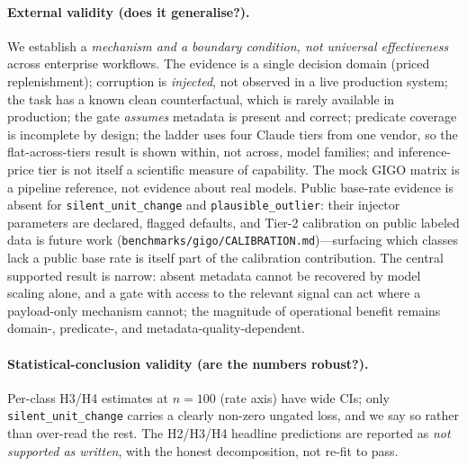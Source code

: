 \documentclass[11pt]{article}
\theoremstyle{plain}
\theoremstyle{definition}
\begin{document}
\paragraph{External validity (does it generalise?).} We establish a \emph{mechanism and a
boundary condition, not universal effectiveness} across enterprise workflows. The evidence
is a single decision domain (priced replenishment); corruption is \emph{injected}, not
observed in a live production system; the task has a known clean counterfactual, which is
rarely available in production; the gate \emph{assumes} metadata is present and correct;
predicate coverage is incomplete by design; the ladder uses four Claude tiers from one
vendor, so the flat-across-tiers result is shown within, not across, model families; and
inference-price tier is not itself a scientific measure of capability. The mock GIGO matrix
is a pipeline reference, not evidence about real models. Public base-rate evidence is absent
for \texttt{silent\_unit\_change} and \texttt{plausible\_outlier}: their injector parameters
are declared, flagged defaults, and Tier-2 calibration on public labeled data is future work
(\texttt{benchmarks/gigo/CALIBRATION.md})---surfacing which classes lack a public base rate
is itself part of the calibration contribution. The central supported result is narrow:
absent metadata cannot be recovered by model scaling alone, and a gate with access to the
relevant signal can act where a payload-only mechanism cannot; the magnitude of operational
benefit remains domain-, predicate-, and metadata-quality-dependent.
\paragraph{Statistical-conclusion validity (are the numbers robust?).} Per-class H3/H4
estimates at $n{=}100$ (rate axis) have wide CIs; only \texttt{silent\_unit\_change}
carries a clearly non-zero ungated loss, and we say so rather than over-read the rest.
The H2/H3/H4 headline predictions are reported as \emph{not supported as written}, with
the honest decomposition, not re-fit to pass.
\end{document}
